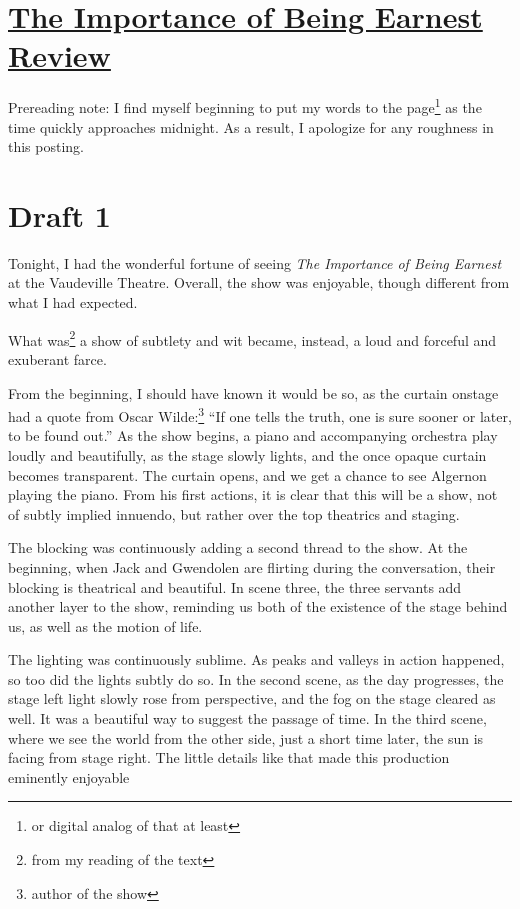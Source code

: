 \documentclass[12pt]{article}[titlepage]
\newcommand{\say}[1]{``#1''}
\newcommand{\1}{\={a}}
\newcommand{\2}{\={e}}
\newcommand{\3}{\={\i}}
\newcommand{\4}{\=o}
\newcommand{\5}{\=u}
\newcommand{\6}{\={A}}
\renewcommand{\,}{\textsuperscript{,}}
\begin{document}
\doublespacing
\section{\href{importance-of-being-earnest.html}{The Importance of Being Earnest Review}}
Prereading note: I find myself beginning to put my words to the page\footnote{or digital analog of that at least} as the time quickly approaches midnight. As a result, I apologize for any roughness in this posting.
\section{Draft 1}
Tonight, I had the wonderful fortune of seeing \textit{The Importance of Being Earnest} at the Vaudeville Theatre.
Overall, the show was enjoyable, though different from what I had expected.

What was\footnote{from my reading of the text} a show of subtlety and wit became, instead, a loud and forceful and exuberant farce.

From the beginning, I should have known it would be so, as the curtain onstage had a quote from Oscar Wilde:\footnote{author of the show} \say{If one tells the truth, one is sure sooner or later, to be found out.}
As the show begins, a piano and accompanying orchestra play loudly and beautifully, as the stage slowly lights, and the once opaque curtain becomes transparent.
The curtain opens, and we get a chance to see Algernon playing the piano.
From his first actions, it is clear that this will be a show, not of subtly implied innuendo, but rather over the top theatrics and staging.

The blocking was continuously adding a second thread to the show.
At the beginning, when Jack and Gwendolen are flirting during the conversation, their blocking is theatrical and beautiful.
In scene three, the three servants add another layer to the show, reminding us both of the existence of the stage behind us, as well as the motion of life.

The lighting was continuously sublime.
As peaks and valleys in action happened, so too did the lights subtly do so.
In the second scene, as the day progresses, the stage left light slowly rose from perspective, and the fog on the stage cleared as well.
It was a beautiful way to suggest the passage of time.
In the third scene, where we see the world from the other side, just a short time later, the sun is facing from stage right.
The little details like that made this production eminently enjoyable
\end{document}
